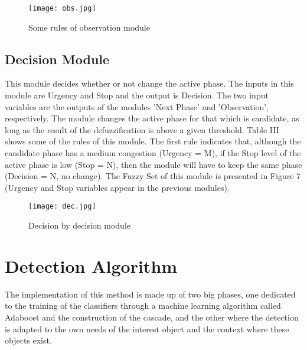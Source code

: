 \documentclass{SureshLimkar}
\begin{document}
\begin{figure}[h]%
\centering
 \texttt{[image: obs.jpg]}%
\caption{Some rules of observation module}%
\label{some rules of observation module}%
\end{figure}

\subsection{Decision Module}

\hspace {0.5 in} This module decides whether or not change the active
phase. The inputs in this module are Urgency and Stop
and the output is Decision. The two input variables are the
outputs of the modules ’Next Phase’ and ’Observation’,
respectively. The module changes the active phase for
that which is candidate, as long as the result of the
defuzziﬁcation is above a given threshold.
Table III shows some of the rules of this module. The
ﬁrst rule indicates that, although the candidate phase has
a medium congestion (Urgency = M), if the Stop level of
the active phase is low (Stop = N), then the module will have to keep the same phase (Decision = N, no change).
The Fuzzy Set of this module is presented in Figure
7 (Urgency and Stop variables appear in the previous
modules).\\

\begin{figure}[h]%
\centering
 \texttt{[image: dec.jpg]}%
\caption{Decision by decision module}%
\label{Decision by decision module}%
\end{figure}

\section{Detection Algorithm}

\hspace {0.5 in} The implementation of this
method is made up of two big phases, one dedicated to the
training of the classiﬁers through a machine learning algorithm
called Adaboost and the construction of the cascade, and the
other where the detection is adapted to the own needs of the
interest object and the context where these objects exist.\\
\end{document}
